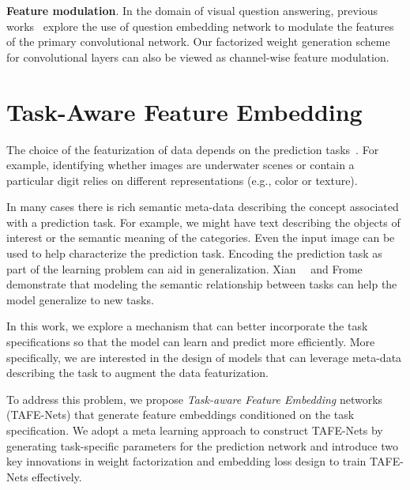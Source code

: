 \documentclass[10pt,twocolumn,letterpaper]{article}
\newcommand{\modelplural}{TAFE-Nets\xspace}
\newcommand\minisection[1]{\vspace{2mm}\noindent \textbf{#1}}
\begin{document}
\minisection{Feature modulation}. In the domain of visual question answering, previous works~\cite{perez2018film, de2017modulating} explore the use of question embedding network 
to modulate the features of the primary convolutional network. Our factorized weight generation
scheme for convolutional layers can also be viewed as channel-wise feature modulation. 

\section{Task-Aware Feature Embedding}

The choice of the featurization of data depends on the prediction tasks~\cite{donahue2014decaf, girshick2014rich}.
For example, identifying whether images are underwater scenes or contain a particular digit relies on different representations (e.g., color or texture). 


In many cases there is rich semantic meta-data describing the concept associated with a prediction task.
For example, we might have text describing the objects of interest or the semantic meaning of the categories.
Even the input image can be used to help characterize the prediction task. 
Encoding the prediction task as part of the learning problem can aid in generalization.
Xian~\etal~\cite{xian2018zero} and Frome~\etal~\cite{frome2013devise} demonstrate that modeling 
the semantic relationship between tasks can help the model 
generalize to new tasks. 


In this work, we explore a mechanism 
that can better incorporate
the task specifications so that the model can learn and 
predict more efficiently. 
More specifically, we are
interested in the design of models that can leverage meta-data describing the task to augment the data featurization.


To address this problem, we propose \textit{Task-aware
Feature Embedding} networks (\modelplural) that generate 
feature embeddings conditioned on the task specification.
We adopt a meta learning approach to construct \modelplural
by generating task-specific parameters for the prediction
network and introduce two key innovations in weight 
factorization and embedding loss design to train \modelplural
effectively. 
\end{document}
